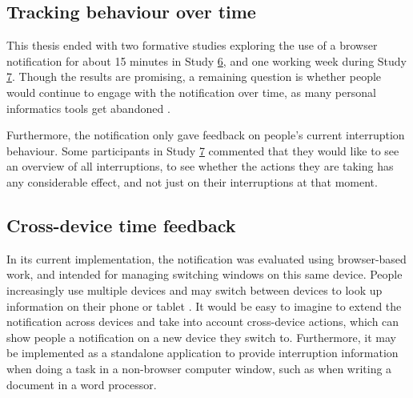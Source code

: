 

\subsection{Tracking behaviour over time}
This thesis ended with two formative studies exploring the use of a browser notification for about 15 minutes in Study \hyperref[st:Study6]{6}, and one working week during Study \hyperref[st:Study7]{7}. Though the results are promising, a remaining question is whether people would continue to engage with the notification over time, as many personal informatics tools get abandoned \citep{Lazar2015}. 

Furthermore, the notification only gave feedback on people’s current interruption behaviour. Some participants in Study \hyperref[st:Study7]{7} commented that they would like to see an overview of all interruptions, to see whether the actions they are taking has any considerable effect, and not just on their interruptions at that moment.

\subsection{Cross-device time feedback}
In its current implementation, the notification was evaluated using browser-based work, and intended for managing switching windows on this same device. People increasingly use multiple devices and may switch between devices to look up information on their phone or tablet \citep{Dearman2008, Jokela2015a, Murphy2016}. It would be easy to imagine to extend the notification across devices and take into account cross-device actions, which can show people a notification on a new device they switch to. Furthermore, it may be implemented as a standalone application to provide interruption information when doing a task in a non-browser computer window, such as when writing a document in a word processor.

